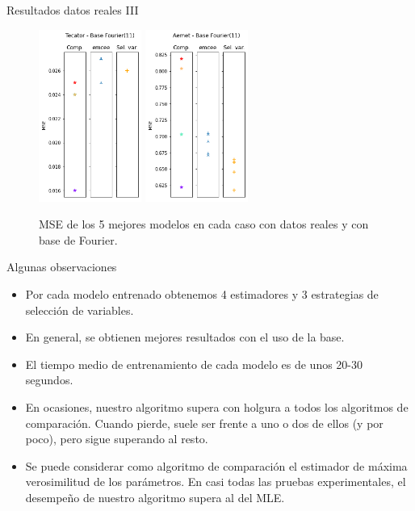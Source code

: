 \documentclass[10pt, spanish, professionalfonts]{beamer}
\begin{document}
\begin{frame}{Resultados datos reales III}
  \begin{figure}
    \includegraphics[width=0.3\textwidth]{img/results/lin_tecator_base11}\hspace{5em}
    \includegraphics[width=0.3\textwidth]{img/results/lin_aemet_base11}
    \caption{MSE de los 5 mejores modelos en cada caso con datos reales y con base de Fourier.}
  \end{figure}
\end{frame}

\begin{frame}{Algunas observaciones}
\begin{itemize}
  \item Por cada modelo entrenado obtenemos 4 estimadores y 3 estrategias de selección de variables.
  \item En general, se obtienen mejores resultados con el uso de la base.
  \item El tiempo medio de entrenamiento de cada modelo es de unos 20-30 segundos.
  \item En ocasiones, nuestro algoritmo supera con holgura a todos los algoritmos de comparación. Cuando pierde, suele ser frente a uno o dos de ellos (y por poco), pero sigue superando al resto.
  \item Se puede considerar como algoritmo de comparación el estimador de máxima verosimilitud de los parámetros. En casi todas las pruebas experimentales, el desempeño de nuestro algoritmo supera al del MLE.
\end{itemize}


\end{frame}
\end{document}
